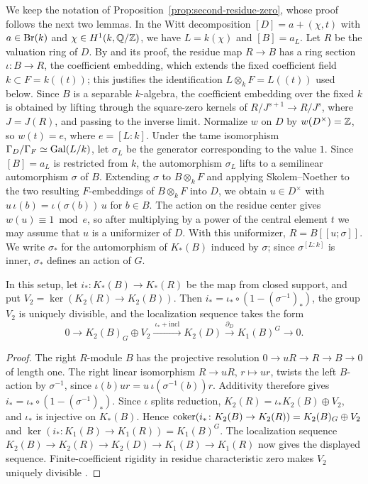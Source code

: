 We keep the notation of Proposition~\ref{prop:second-residue-zero}, whose proof follows the next two lemmas.
In the Witt decomposition $[D]=a+(\chi,t)$ with $a\in\operatorname{Br}(k)$ and $\chi\in H^1(k,\mathbb Q/\mathbb Z)$, we have $L=k(\chi)$ and $[B]=a_L$.
Let $R$ be the valuation ring of $D$.
By \cite[Theorem 1]{Zheglov2004} and its proof, the residue map $R\to B$ has a ring section $\iota\colon B\to R$, the coefficient embedding, which extends the fixed coefficient field $k\subset F=k((t))$; this justifies the identification $L\otimes_kF=L((t))$ used below.
Since $B$ is a separable $k$-algebra, the coefficient embedding over the fixed $k$ is obtained by lifting through the square-zero kernels of $R/J^{s+1}\to R/J^s$, where $J=J(R)$, and passing to the inverse limit.
Normalize $w$ on $D$ by $w(D^\times)=\mathbb Z$, so $w(t)=e$, where $e=[L:k]$.
Under the tame isomorphism $\Gamma_D/\Gamma_F\simeq\operatorname{Gal}(L/k)$, let $\sigma_L$ be the generator corresponding to the value $1$.
Since $[B]=a_L$ is restricted from $k$, the automorphism $\sigma_L$ lifts to a semilinear automorphism $\sigma$ of $B$.
Extending $\sigma$ to $B\otimes_kF$ and applying Skolem--Noether to the two resulting $F$-embeddings of $B\otimes_kF$ into $D$, we obtain $u\in D^\times$ with $u\,\iota(b)=\iota(\sigma(b))\,u$ for $b\in B$.
The action on the residue center gives $w(u)\equiv1\bmod e$, so after multiplying by a power of the central element $t$ we may assume that $u$ is a uniformizer of $D$.
With this uniformizer, $R=B[[u;\sigma]]$.
We write $\sigma_*$ for the automorphism of $K_*(B)$ induced by $\sigma$; since $\sigma^{[L:k]}$ is inner, $\sigma_*$ defines an action of $G$.

\begin{lemma}\label{lem:second-residue-zero-localization}
In this setup, let $i_*\colon K_*(B)\to K_*(R)$ be the map from closed support, and put $V_2=\ker(K_2(R)\to K_2(B))$.
Then $i_*=\iota_*\circ(1-(\sigma^{-1})_*)$, the group $V_2$ is uniquely divisible, and the localization sequence takes the form
\[
 0\longrightarrow K_2(B)_G\oplus V_2
 \xrightarrow{\ \iota_*+\mathrm{incl}\ } K_2(D)\xrightarrow{\partial_D}K_1(B)^G
 \longrightarrow0.
\]
\end{lemma}
\begin{proof}
The right $R$-module $B$ has the projective resolution $0\to uR\to R\to B\to0$ of length one.
The right linear isomorphism $R\to uR$, $r\mapsto ur$, twists the left $B$-action by $\sigma^{-1}$, since $\iota(b)ur=u\,\iota(\sigma^{-1}(b))r$.
Additivity therefore gives $i_*=\iota_*\circ(1-(\sigma^{-1})_*)$.
Since $\iota$ splits reduction, $K_2(R)=\iota_*K_2(B)\oplus V_2$, and $\iota_*$ is injective on $K_*(B)$.
Hence $\operatorname{coker}(i_*\colon K_2(B)\to K_2(R))=K_2(B)_G\oplus V_2$ and $\ker(i_*\colon K_1(B)\to K_1(R))=K_1(B)^G$.
The localization sequence $K_2(B)\to K_2(R)\to K_2(D)\to K_1(B)\to K_1(R)$ now gives the displayed sequence.
Finite-coefficient rigidity in residue characteristic zero makes $V_2$ uniquely divisible \cite[\S3, Corollary 2 to Theorem 2]{SuslinYufryakov}.
\end{proof}

